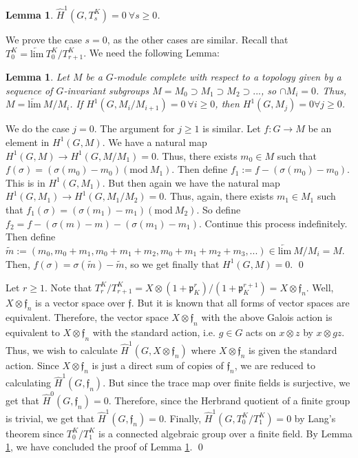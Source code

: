 \documentclass[11pt]{amsart}
\theoremstyle{plain}
\newtheorem{lemma}[enumi]{Lemma}
\begin{document}
\begin{lemma}\label{H1compactpart}
$\hat{H}^1(G, T_{s}^K) = 0 \ \forall s \geq 0$.
\end{lemma}

\proof
We prove the case $s = 0$, as the other cases are similar.  Recall that $T_0^K = \underleftarrow{\mathrm{lim}} \ T_0^K / T_{r+1}^K$.  We need the following Lemma:

\begin{lemma}\label{abstractcohomology}
Let $M$ be a $G$-module complete with respect to a topology given by a sequence of $G$-invariant subgroups $M = M_0 \supset M_1 \supset M_2 \supset ...$, so $\cap M_i = 0$.  Thus, $M = \underleftarrow{\mathrm{lim}} \ M / M_i$.  If $H^1(G, M_i / M_{i+1}) = 0 \ \forall i \geq 0$, then $H^1(G, M_j) = 0 \forall j \geq 0$.
\end{lemma}

\proof
We do the case $j = 0$.  The argument for $j \geq 1$ is similar.  Let $f : G \rightarrow M$ be an element in $H^1(G,M)$.  We have a natural map $H^1(G, M ) \rightarrow H^1(G, M / M_1) = 0$.  Thus, there exists $m_0 \in M$ such that $f(\sigma) = (\sigma(m_0) - m_0) (\mathrm{mod}  \ M_1)$.  Then define $f_1 := f - (\sigma(m_0) - m_0)$.  This is in $H^1(G, M_1)$. But then again we have the natural map $H^1(G, M_1) \rightarrow H^1(G, M_1 / M_2) = 0$.  Thus, again, there exists $m_1 \in M_1$ such that $f_1(\sigma) = (\sigma(m_1) - m_1) (\mathrm{mod} \ M_2)$.  So define $f_2 = f - (\sigma(m) - m) - (\sigma(m_1) - m_1)$.  Continue this process indefinitely.  Then define $\tilde{m} := (m_0, m_0 + m_1, m_0 + m_1 + m_2, m_0 + m_1 + m_2 + m_3, ...) \in \underleftarrow{\mathrm{lim}} \ M / M_i = M$.  Then, $f(\sigma) = \sigma(\tilde{m}) - \tilde{m}$, so we get finally that $H^1(G,M) = 0$.
\qed

Let $r \geq 1$.  Note that $T_r^K / T_{r+1}^K = X \otimes (1 + \mathfrak{p}_K^r) / (1 + \mathfrak{p}_K^{r+1}) = X \otimes \mathfrak{f}_n$.  Well, $X \otimes \mathfrak{f}_n$ is a vector space over $\mathfrak{f}$.  But it is known that all forms of vector spaces are equivalent.  Therefore, the vector space $X \otimes \mathfrak{f}_n$ with the above Galois action is equivalent to $X \otimes \mathfrak{f}_n$ with the standard action, i.e. $g \in G$ acts on $x \otimes z$ by $x \otimes gz$.   Thus, we wish to calculate $\hat{H}^1(G, X \otimes \mathfrak{f}_n)$ where $X \otimes \mathfrak{f}_n$ is given the standard action.  Since $X \otimes \mathfrak{f}_n$ is just a direct sum of copies of $\mathfrak{f}_n$, we are reduced to calculating $\hat{H}^1(G, \mathfrak{f}_n)$.  But since the trace map over finite fields is surjective, we get that $\hat{H}^0(G, \mathfrak{f}_n) = 0$.  Therefore, since the Herbrand quotient of a finite group is trivial, we get that $\hat{H}^1(G, \mathfrak{f}_n) = 0$.  Finally, $\hat{H}^1(G, T_0^K / T_1^K) = 0$ by Lang's theorem since $T_0^K / T_1^K$ is a connected algebraic group over a finite field.  By Lemma \ref{abstractcohomology}, we have concluded the proof of Lemma \ref{H1compactpart}.
\qed
\end{document}

